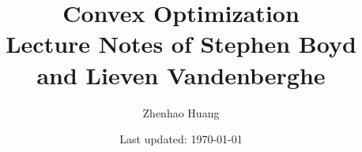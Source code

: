\documentclass[letterpaper, 12pt]{article}
\numberwithin{equation}{section}
\newcommand{\1}{\mathds{1}}	%
\theoremstyle{definition}
\begin{document}

\title{Convex Optimization \\[1em]
\normalsize Lecture Notes of Stephen Boyd and Lieven Vandenberghe \cite{boyd2023convex}}


\author{\normalsize Zhenhao Huang}
\date{\normalsize\vspace{-1ex} Last updated: \today}


\maketitle
\tableofcontents\label{sec:contents}




\newpage


\end{document}
